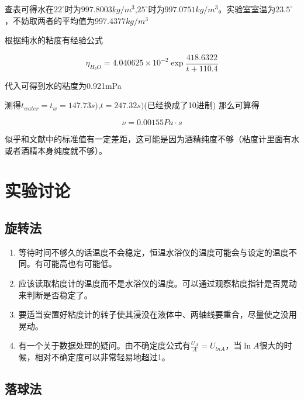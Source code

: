 \documentclass[12pt,a4paper]{ctexart}
\begin{document}
查表可得水在$22^{\circ}$时为$997.8003kg/m^3$,$25^{\circ}$时为$997.0751kg/m^3$。实验室室温为$23.5^{\circ}$，不妨取两者的平均值为$997.4377kg/m^3$

根据\cite{jcwlsyjy}纯水的粘度有经验公式

$$\eta_{H_2O}=4.040625\times 10^{-2}\exp{\frac{418.6322}{t+110.4}}$$

代入可得到水的粘度为0.921mPa

测得$t_{water}=t_w=147.73s 
)$,$t=247.32s
)$(已经换成了10进制)
那么可算得

$$\nu=0.00155 Pa\cdot s$$

似乎和文献中的标准值有一定差距，这可能是因为酒精纯度不够（粘度计里面有水或者酒精本身纯度就不够）。

\section{实验讨论}
\subsection{旋转法}
\begin{enumerate}
\item 等待时间不够久的话温度不会稳定，恒温水浴仪的温度可能会与设定的温度不同。有可能高也有可能低。
\item 应该读取粘度计的温度而不是水浴仪的温度。可以通过观察粘度指针是否晃动来判断是否稳定了。
\item 要适当安置好粘度计的转子使其浸没在液体中、两轴线要重合，尽量使之没用晃动。
\item 有一个关于数据处理的疑问。由不确定度公式有$\frac{U_A}{A}=U_{lnA}$，当$\ln{A}$很大的时候，相对不确定度可以非常轻易地超过1。
\end{enumerate}
\subsection{落球法}
\end{document}
